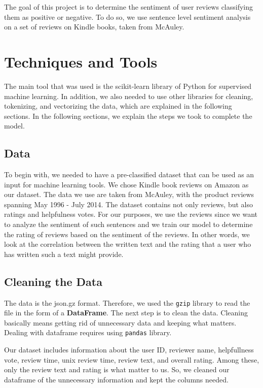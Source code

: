 \documentclass[a4paper,12pt]{article}
\begin{document}
The goal of this project is to determine the sentiment of user reviews classifying them as positive or negative. To do so, we use sentence level sentiment analysis on a set of reviews on Kindle books, taken from McAuley. 


\section{Techniques and Tools}
The main tool that was used is the scikit-learn library of Python for supervised machine
learning. In addition, we also needed to use other libraries for cleaning, tokenizing, and vectorizing the data, which are explained in the following sections. In the following sections, we explain the steps we took to complete the model.


\subsection{Data}
To begin with, we needed to have a pre-classified dataset that can be used as an input for machine learning tools. We chose Kindle book reviews on Amazon as our dataset. The data we use are taken from McAuley, with the product reviews spanning May 1996 - July 2014. The dataset contains not only reviews, but also ratings and helpfulness votes. For our purposes, we use the reviews since we want to analyze the sentiment of such sentences and we train our model to determine the rating of reviews based on the sentiment of the reviews. In other words, we look at the correlation between the written text and the rating that a user who has written such a text might provide. 

\subsection{Cleaning the Data}
The data is the json.gz format. Therefore, we used the \texttt{gzip} library to read the file in the form of a \textbf{DataFrame}. The next step is to clean the data. Cleaning basically means getting rid of unnecessary data and keeping what matters. Dealing with dataframe requires using \texttt{pandas} library. 

Our dataset includes information about the user ID, reviewer name, helpfullness vote, review time, unix review time, review text, and overall rating. Among these, only the review text and rating is what matter to us. So, we cleaned our dataframe of the unnecessary information and kept the columns needed. 
\end{document}
